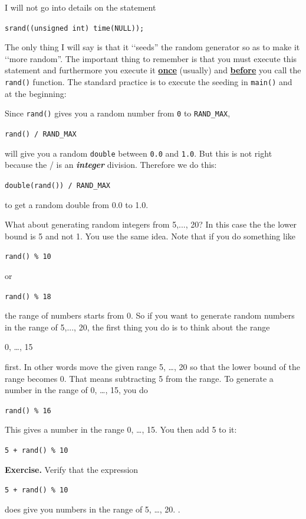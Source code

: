 I will not go into details on the statement
\begin{center}
\texttt{srand((unsigned int) time(NULL));}
\end{center}
The only thing I will say is that it \lq\lq seeds'' the random generator so
as to make it \lq\lq more random''. The important thing to remember is that
you must execute this statement and furthermore you execute it
\textbf{\underline{once}} (usually) and \textbf{\underline{before}} you call the \texttt{rand()} function. The standard practice is to execute the seeding
in \texttt{main()} and at the beginning:
Since \verb!rand()! gives you a random number from \verb!0! to \verb!RAND_MAX!,
\begin{center}
\texttt{rand() / RAND\_MAX}
\end{center}
will give you a random \verb!double! between \verb!0.0! and \verb!1.0!.
But this is not right because the / is an \textit{\textbf{integer}}
division. Therefore we do this:
\begin{center}
\texttt{double(rand()) / RAND\_MAX}
\end{center}
to get a random double from 0.0 to 1.0.




What about generating random integers from 5,..., 20? In this case the the lower bound is 5 and not 1. You use the same idea. Note that if you do something like
\begin{center}
\texttt{rand() \% 10}
\end{center}
or
\begin{center}
\texttt{rand() \% 18}
\end{center}
the range of numbers starts from 0. So if you want to generate random
numbers in the range of 5,..., 20, the first thing you do is to think
about the range
\begin{center}
0, \dots, 15
\end{center}
first. In other words move the given range 5, \ldots, 20 so that the
lower bound of the range becomes 0. That means subtracting 5 from the
range. To generate a number in the range of 0, \ldots, 15, you do
\begin{center}
\texttt{rand() \% 16}
\end{center}
This gives a number in the range 0, \ldots, 15. You then add 5 to it:
\begin{center}
\texttt{5 + rand() \% 10}
\end{center}
\textbf{Exercise.} Verify that the expression\\
\begin{center}
\texttt{5 + rand() \% 10}
\end{center}
does give you numbers in the range of 5, \dots, 20. .







